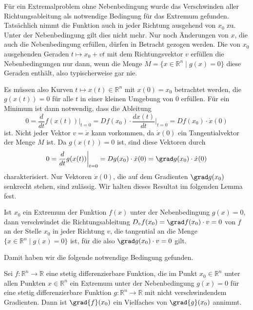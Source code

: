 Für ein Extremalproblem ohne Nebenbedingung wurde das Verschwinden
aller Richtungsableitung als notwendige Bedingung für das
Extremum gefunden.
Tatsächlich nimmt die Funktion auch in jeder Richtung ausgehend
von $x_0$ zu.
Unter der Nebenbedingung gilt dies nicht mehr.
Nur noch Änderungen von $x$, die auch die Nebenbedingung
erfüllen, dürfen in Betracht gezogen werden.
Die von $x_0$ ausgehenden Geraden $t\mapsto x_0+vt$ mit dem
Richtungsvektor $v$ erfüllen die Nebenbedingungen nur dann, wenn
die Menge $M=\{x\in\mathbb{R}^n \mid g(x)=0\}$ diese Geraden enthält,
also typischerweise gar nie.

Es müssen also Kurven $t\mapsto x(t)\in\mathbb{R}^n$ mit $x(0)=x_0$
betrachtet werden, die $g(x(t))=0$ für alle $t$ in einer kleinen Umgebung
von $0$ erfüllen.
Für ein Minimum ist dann notwendig, dass die Ableitung
\begin{equation}
0
=
\frac{d}{dt} f(x(t))\bigg|_{t=0}
=
Df(x_0)\cdot \frac{dx(t)}{dt}\bigg|_{t=0}
=
Df(x_0)\cdot \dot{x}(0)
\label{buch:fuvar:nebenbedingungen:eqn:gradf}
\end{equation}
ist.
Nicht jeder Vektor $v=\dot{x}$ kann vorkommen, da $\dot{x}(0)$ ein
Tangentialvektor der Menge $M$ ist.
Da $g(x(t))=0$ ist, sind diese Vektoren durch
\begin{equation}
0
=
\frac{d}{dt}g(x(t))\bigg|_{t=0}
=
Dg(x_0)\cdot \dot{x}(0)
=
\grad g(x_0)\cdot \dot{x}(0)
\label{buch:fuvar:nebenbedingungen:eqn:gradg}
\end{equation}
charakterisiert.
Nur Vektoren $\dot{x}(0)$, die auf dem Gradienten $\grad g(x_0)$ 
senkrecht stehen, sind zulässig.
Wir halten dieses Resultat im folgenden Lemma fest.

\begin{lemma}
\label{buch:fuvar:nebenbedingungen:lemma:nebenbedingungen}
Ist $x_0$ ein Extremum der Funktion $f(x)$ unter der Nebenbedingung
$g(x)=0$, dann verschwindet die Richtungsableitung
\(
D_vf(x_0) = \grad f(x_0)\cdot v = 0
\)
von $f$ an der Stelle $x_0$ in jeder Richtung $v$, die tangential
an die Menge $\{x\in\mathbb{R}^n \mid g(x)=0\}$ ist, für die also
$\grad g(x_0)\cdot v=0$ gilt.
\end{lemma}

Damit haben wir die folgende notwendige Bedingung gefunden.
%

\begin{satz}
\label{buch:fuvar:nebenbedingungen:satz:nebenbedingung}
Sei $f\colon\mathbb{R}^n\to\mathbb{R}$ eine stetig differenzierbare
Funktion, die im Punkt $x_0\in\mathbb{R}^n$ unter allen Punkten
$x\in\mathbb{R}^n$ ein Extremum unter der Nebenbedingung
$g(x)=0$ für eine stetig differenzierbare Funktion
$g\colon\mathbb{R}^n\to\mathbb{R}$ mit nicht verschwindendem Gradienten.
Dann ist $\grad{f}(x_0)$ ein Vielfaches von $\grad{g}(x_0)$
annimmt.
\end{satz}

